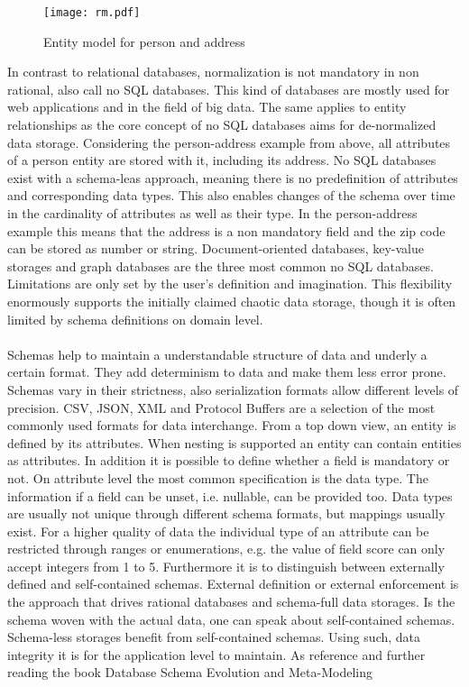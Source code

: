 \begin{figure}[htb]
  \centering
  \texttt{[image: rm.pdf]}\\
  \caption{Entity model for person and address}\label{fig:rm}
\end{figure}

In contrast to relational databases, normalization is not mandatory in non rational, also call no SQL databases. This kind of databases are mostly used for web applications and in the field of big data. The same applies to entity relationships as the core concept of no SQL databases aims for de-normalized data storage. Considering the person-address example from above, all attributes of a person entity are stored with it, including its address. No SQL databases exist with a schema-leas approach, meaning there is no predefinition of attributes and corresponding data types. This also enables changes of the schema over time in the cardinality of attributes as well as their type. In the person-address example this means that the address is a non mandatory field and the zip code can be stored as number or string. Document-oriented databases, key-value storages and graph databases are the three most common no SQL databases.  Limitations are only set by the user's definition and imagination. This flexibility enormously supports the initially claimed chaotic data storage, though it is often limited by schema definitions on domain level. 
\\\\
Schemas help to maintain a understandable structure of data and underly a certain format. They add determinism to data and make them less error prone. Schemas vary in their strictness, also serialization formats allow different levels of precision. CSV, JSON, XML and Protocol Buffers are a selection of the most commonly used formats for data interchange. From a top down view, an entity is defined by its attributes. When nesting is supported an entity can contain entities as attributes. In addition it is possible to define whether a field is mandatory or not. On attribute level the most common specification is the data type. The information if a field can be unset, i.e. nullable, can be provided too. Data types are usually not unique through different schema formats, but mappings usually exist. For a higher quality of data the individual type of an attribute can be restricted through ranges or enumerations, e.g. the value of field score can only accept integers from 1 to 5. Furthermore it is to distinguish between externally defined and self-contained schemas. External definition or external enforcement is the approach that drives rational databases and schema-full data storages. Is the schema woven with the actual data, one can speak about self-contained schemas. Schema-less storages benefit from self-contained schemas. Using such, data integrity it is for the application level to maintain. As reference and further reading the book Database Schema Evolution and Meta-Modeling
